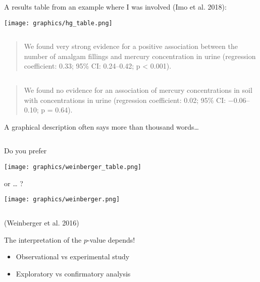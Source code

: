 \documentclass[
  10pt,
  ignorenonframetext,
]{beamer}
\providecommand{\tightlist}{%
  \setlength{\itemsep}{0pt}\setlength{\parskip}{0pt}}
\begin{document}
\begin{frame}
A results table from an example where I was involved (Imo et al. 2018):

\centering

\texttt{[image: graphics/hg\_table.png]}

\(~\)

\begin{quote}
We found very strong evidence for a positive association between the
number of amalgam fillings and mercury concentration in urine
(regression coefficient: 0.33; 95\% CI: 0.24--0.42; p \textless{}
0.001).
\end{quote}

\(~\)

\begin{quote}
We found no evidence for an association of mercury concentrations in
soil with concentrations in urine (regression coefficient: 0.02; 95\%
CI: −0.06--0.10; p = 0.64).
\end{quote}
\end{frame}

\begin{frame}
A graphical description often says more than thousand words\ldots{}

\(~\)

Do you prefer

\centering

\texttt{[image: graphics/weinberger\_table.png]}
\end{frame}

\begin{frame}
or \ldots{} ?

\centering\texttt{[image: graphics/weinberger.png]}

\(~\)

\flushleft
\scriptsize

(Weinberger et al. 2016)
\end{frame}

\begin{frame}
\begin{block}{The interpretation of the \(p\)-value depends!}
\protect\hypertarget{the-interpretation-of-the-p-value-depends}{}
\(~\)

\begin{itemize}
\tightlist
\item
  Observational vs experimental study
\end{itemize}

\vspace{2mm}

\begin{itemize}
\tightlist
\item
  Exploratory vs confirmatory analysis
\end{itemize}
\end{block}
\end{frame}
\end{document}
